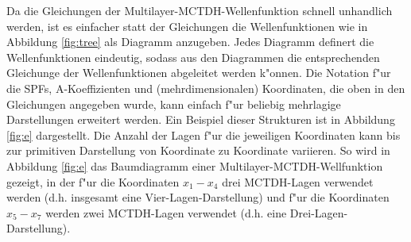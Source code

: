 Da die Gleichungen der Multilayer-MCTDH-Wellenfunktion schnell unhandlich werden, ist es einfacher statt der Gleichungen die Wellenfunktionen 
wie in Abbildung \ref{fig:tree}
als Diagramm anzugeben. Jedes Diagramm definert die Wellenfunktionen eindeutig, sodass aus den Diagrammen die entsprechenden
Gleichunge der Wellenfunktionen abgelei\-tet werden k"onnen.
Die Notation f"ur die SPFs, A-Koeffizienten und (mehrdimensionalen) Koordinaten, die oben in den Gleichungen angegeben wurde,
kann einfach f"ur beliebig mehrlagige Darstellungen erweitert werden. 
Ein Beispiel dieser Strukturen ist in Abbildung \ref{fig:e} dargestellt. 
Die Anzahl der Lagen f"ur die jeweiligen Koordinaten kann bis zur primitiven Darstellung von 
Koordinate zu Koordinate variieren.
So wird in Abbildung \ref{fig:e} das Baumdiagramm einer Multilayer-MCTDH-Wellfunktion gezeigt, 
in der f"ur die Koordinaten $ x_1-x_4 $ drei MCTDH-Lagen verwendet werden 
(d.h. insgesamt eine Vier-Lagen-Darstellung)
und f"ur die Koordinaten $ x_5 - x_7 $  werden zwei MCTDH-Lagen verwendet (d.h. eine Drei-Lagen-Darstellung).

